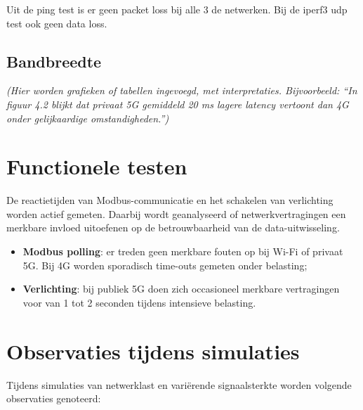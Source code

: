 Uit de ping test is er geen packet loss bij alle 3 de netwerken. Bij de iperf3 udp test ook geen data loss.

\subsection{Bandbreedte}



\textit{(Hier worden grafieken of tabellen ingevoegd, met interpretaties. Bijvoorbeeld: “In figuur 4.2 blijkt dat privaat 5G gemiddeld 20 ms lagere latency vertoont dan 4G onder gelijkaardige omstandigheden.”)}

\section{Functionele testen}

De reactietijden van Modbus-communicatie en het schakelen van verlichting worden actief gemeten. Daarbij wordt geanalyseerd of netwerkvertragingen een merkbare invloed uitoefenen op de betrouwbaarheid van de data-uitwisseling.

\begin{itemize}
    \item \textbf{Modbus polling}: er treden geen merkbare fouten op bij Wi-Fi of privaat 5G. Bij 4G worden sporadisch time-outs gemeten onder belasting;
    \item \textbf{Verlichting}: bij publiek 5G doen zich occasioneel merkbare vertragingen voor van 1 tot 2 seconden tijdens intensieve belasting.
\end{itemize}

\section{Observaties tijdens simulaties}

Tijdens simulaties van netwerklast en variërende signaalsterkte worden volgende observaties genoteerd:




